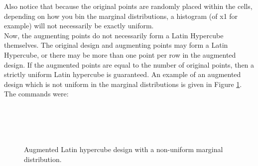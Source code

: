 \documentclass[12pt]{article}
\begin{document}
Also notice that because the original points are randomly placed within the cells, depending on how you bin the marginal distributions, a histogram (of x1 for example) will not necessarily be exactly uniform.\\

Now, the augmenting points do not necessarily form a Latin Hypercube themselves.  The original design and augmenting points may form a Latin Hypercube, or there may be more than one point per row in the augmented design.  If the augmented points are equal to the number of original points, then a strictly uniform Latin hypercube is guaranteed.  An example of an augmented design which is not uniform in the marginal distributions is given in Figure \ref{fig:badAugment}.  The commands were:\\
\\
\indent{}\\
\indent{}\\
\\

\begin{figure}[p]
  \centering
  \hspace{0.5in}
  \caption{Augmented Latin hypercube design with a non-uniform marginal distribution.}
  \label{fig:badAugment} %
\end{figure}
\end{document}

